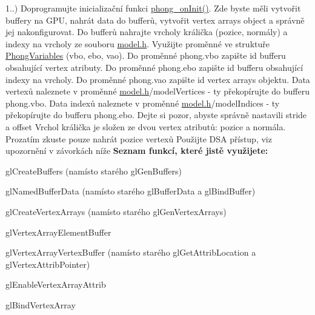 
\begin{DoxyRefList}
\item[\label{todo__todo000004}%
\hypertarget{todo__todo000004}{}%
Module \hyperlink{group__task1}{task1} ]1..) Doprogramujte inicializační funkci \hyperlink{student_8h_ac2adb2ba4e748239b9db4d037584d3cc}{phong\+\_\+on\+Init()}. Zde byste měli vytvořit buffery na G\+P\+U, nahrát data do bufferů, vytvořit vertex arrays object a správně jej nakonfigurovat. Do bufferů nahrajte vrcholy králička (pozice, normály) a indexy na vrcholy ze souboru \hyperlink{model_8h}{model.\+h}. Využijte proměnné ve struktuře \hyperlink{structPhongVariables}{Phong\+Variables} (vbo, ebo, vao). Do proměnné phong.\+vbo zapište id bufferu obsahující vertex atributy. Do proměnné phong.\+ebo zapište id bufferu obsahující indexy na vrcholy. Do proměnné phong.\+vao zapište id vertex arrays objektu. Data vertexů naleznete v proměnné \hyperlink{model_8h}{model.\+h}/model\+Vertices -\/ ty překopírujte do bufferu phong.\+vbo. Data indexů naleznete v proměnné \hyperlink{model_8h}{model.\+h}/model\+Indices -\/ ty překopírujte do bufferu phong.\+ebo. Dejte si pozor, abyste správně nastavili stride a offset Vrchol králička je složen ze dvou vertex atributů\+: pozice a normála. Prozatím zkuste pouze nahrát pozice vertexů Použijte D\+S\+A přístup, viz upozornění v závorkách níže {\bfseries Seznam funkcí, které jistě využijete\+:}
\begin{DoxyItemize}
\item gl\+Create\+Buffers (namísto starého gl\+Gen\+Buffers)
\item gl\+Named\+Buffer\+Data (namísto starého gl\+Buffer\+Data a gl\+Bind\+Buffer)
\item gl\+Create\+Vertex\+Arrays (namísto starého gl\+Gen\+Vertex\+Arrays)
\item gl\+Vertex\+Array\+Element\+Buffer
\item gl\+Vertex\+Array\+Vertex\+Buffer (namísto starého gl\+Get\+Attrib\+Location a gl\+Vertex\+Attrib\+Pointer)
\item gl\+Enable\+Vertex\+Array\+Attrib
\item gl\+Bind\+Vertex\+Array 
\end{DoxyItemize}


\end{DoxyRefList}
